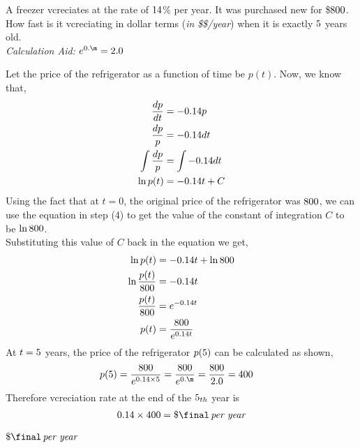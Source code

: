



\MULTIPLY\vc\vd\m
\gcalcexpr[2]

\question[2] A freezer vcreciates at the rate of $14$\% per year. It
was purchased new for \$$800$. How fast is it vcreciating in dollar
terms (\textit{in \$\$/year}) when it is exactly $5$ years old.\\
\textit{Calculation Aid: $e^{0.\m}=\va$}

\watchout

\begin{solution}[\halfpage]
  Let the price of the refrigerator as a function of time be $p(t)$.
  Now, we know that,
  \begin{align}
    \dfrac{dp}{dt}    &= -0.14 p \\
    \dfrac{dp}{p}     &= -0.14 dt \\
    \int\dfrac{dp}{p} &= \int -0.14 dt \\
    \ln p(t)          &= -0.14 t + C
  \end{align}
  Using the fact that at $t=0$, the original price of the refrigerator 
  was $800$, we can use the equation in step (4) to get the value of 
  the constant of integration $C$ to be $\ln800$. \\
  Substituting this value of $C$ back in the equation we get,
  \begin{align}
    \ln p(t)                &= -0.14 t + \ln 800 \\
    \ln \dfrac{p(t)}{800} &= -0.14 t \\
    \dfrac{p(t)}{800}     &= e^{-0.14 t} \\
    p(t)                    &= \dfrac{800}{e^{0.14 t}}
  \end{align}
  At $t=5$ years, the price of the refrigerator $p(5)$ can be
  calculated as shown,
  \begin{align}
    p(\vd) &= \dfrac{\vb}{e^{0.\vc\times\vd}}
             = \dfrac{\vb}{e^{0.\m}} = \dfrac{\vb}{\va}
             = \ve
  \end{align}
  Therefore vcreciation rate at the end of the $5_{th}$ year is
  \begin{align}
    0.\vc\times\ve = \$\final\,\textit{per year}
  \end{align}

\end{solution}

\ifprintanswers
  \begin{codex}
    $\$\final\,\textit{per year}$
  \end{codex}
\fi

